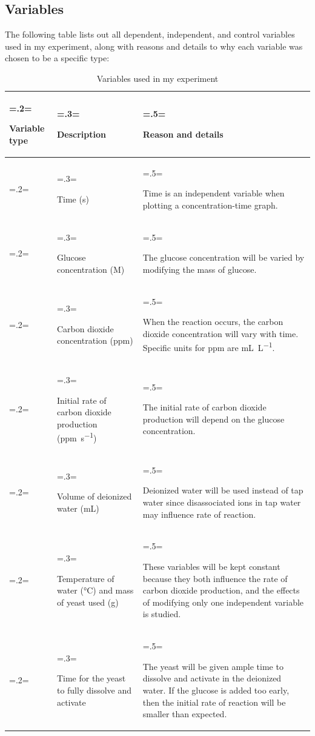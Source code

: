 \documentclass{article}
\begin{document}
\subsection{Variables}
The following table lists out all dependent, independent, and control variables used in my experiment, along with reasons and details to why each variable was chosen to be a specific type:
\begin{table}[H]
\centering
\caption{Variables used in my experiment}
\label{table:2}
\begin{tabularx}{\textwidth} {
    | >{\hsize=.2\hsize \linewidth=\hsize \raggedright\arraybackslash}X
    | >{\hsize=.3\hsize \linewidth=\hsize \raggedright\arraybackslash}X
    | >{\hsize=.5\hsize \linewidth=\hsize \raggedright\arraybackslash}X |}
    \hline
    \textbf{Variable type} & \textbf{Description} & \textbf{Reason and details} \\
    \hline
    \multirow[t]{2}{\hsize}{Independent} & Time (\si{s}) & Time is an independent variable when plotting a concentration-time graph. \\
    \cline{2-3}
    & Glucose concentration (\si{M}) & The glucose concentration will be varied by modifying the mass of glucose. \\
    \hline
    \multirow[t]{2}{\hsize}{Dependent} & Carbon dioxide concentration (\si{ppm}) & When the reaction occurs, the carbon dioxide concentration will vary with time. Specific units for ppm are \si{mL.L^{-1}}. \\
    \cline{2-3}
    & Initial rate of carbon dioxide production (\si{ppm.s^{-1}}) & The initial rate of carbon dioxide production will depend on the glucose concentration. \\
    \hline
    \multirow[t]{3}{\hsize}{Control} & Volume of deionized water (\si{mL}) & Deionized water will be used instead of tap water since disassociated ions in tap water may influence rate of reaction. \\
    \cline{2-3}
    & Temperature of water (\si{\celsius}) and mass of yeast used (\si{g}) & These variables will be kept constant because they both influence the rate of carbon dioxide production, and the effects of modifying only one independent variable is studied. \\
    \cline{2-3}
    & Time for the yeast to fully dissolve and activate & The yeast will be given ample time to dissolve and activate in the deionized water. If the glucose is added too early, then the initial rate of reaction will be smaller than expected. \\
    \hline
\end{tabularx}
\end{table}
\end{document}
